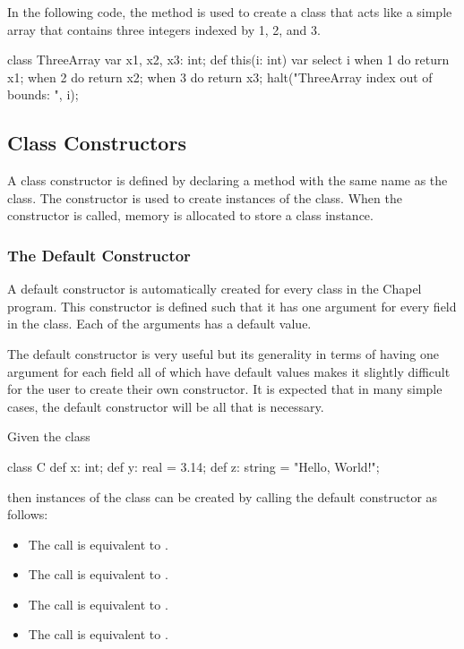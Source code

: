 \begin{example}
In the following code, the  method is used to create a
class that acts like a simple array that contains three integers
indexed by 1, 2, and 3.
\begin{chapel}
class ThreeArray {
  var x1, x2, x3: int;
  def this(i: int) var {
    select i {
      when 1 do return x1;
      when 2 do return x2;
      when 3 do return x3;
    }
    halt("ThreeArray index out of bounds: ", i);
  }
}
\end{chapel}
\end{example}

\subsection{Class Constructors}
\label{Class_Constructors}

A class constructor is defined by declaring a method with the same
name as the class.  The constructor is used to create instances of the
class.  When the constructor is called, memory is allocated to store a
class instance.

\subsubsection{The Default Constructor}
\label{The_Default_Constructor}

A default constructor is automatically created for every class in the
Chapel program.  This constructor is defined such that it has one
argument for every field in the class.  Each of the arguments has a
default value.

The default constructor is very useful but its generality in terms of
having one argument for each field all of which have default values
makes it slightly difficult for the user to create their own
constructor.  It is expected that in many simple cases, the default
constructor will be all that is necessary.

\begin{example}
Given the class
\begin{chapel}
class C {
  def x: int;
  def y: real = 3.14;
  def z: string = "Hello, World!";
}
\end{chapel}
then instances of the class can be created by calling the default
constructor as follows:
\begin{itemize}
\item The call  is equivalent to .
\item The call  is equivalent to .
\item The call  is equivalent to .
\item The call  is equivalent to .
\end{itemize}
\end{example}

